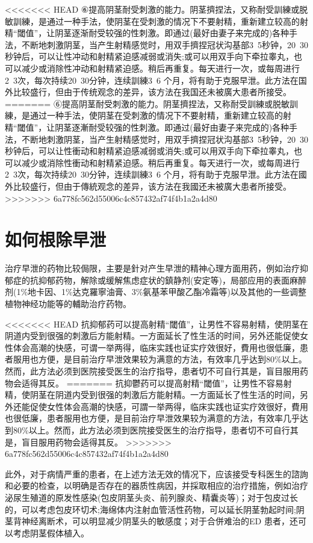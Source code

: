 \documentclass[12pt,UTF8]{ctexbook}
\begin{document}
<<<<<<< HEAD
⑥提高阴茎耐受刺激的能力。阴茎擠捏法，又称耐受訓練或脱敏訓練，是通过一种手法，使阴茎在受刺激的情况下不要射精，重新建立较高的射精“閾值”，让阴茎逐渐耐受较强的性刺激。即通过(最好由妻子来完成的)各种手法，不断地刺激阴茎，当产生射精感觉时，用双手擠捏冠状沟基部3~5秒钟，20~30秒钟后，可以让性冲动和射精紧迫感减弱或消失;或可以用双手向下牵拉睾丸，也可以减少或消除性冲动和射精紧迫感。稍后再重复。每天进行一次，或每周进行2~3次，每次持续20~30分钟，连续訓練3~6 个月，将有助于克服早泄。此方法在国外比较盛行，但由于传统观念的差异，该方法在我国还未被廣大患者所接受。
=======
⑥提高阴茎耐受刺激的能力。阴茎擠捏法，又称耐受訓練或脱敏訓練，是通过一种手法，使阴茎在受刺激的情况下不要射精，重新建立较高的射精“閾值”，让阴茎逐漸耐受较强的性刺激。即通过(最好由妻子来完成的)各种手法，不断地刺激阴茎，当产生射精感觉时，用双手擠捏冠状沟基部3~5秒钟，20~30秒钟后，可以让性衝动和射精紧迫感减弱或消失;或可以用双手向下牵拉睾丸，也可以减少或消除性衝动和射精紧迫感。稍后再重复。每天进行一次，或每周进行2~3次，每次持续20~30分钟，连续訓練3~6 个月，将有助于克服早泄。此方法在國外比较盛行，但由于傳統观念的差异，该方法在我國还未被廣大患者所接受。
>>>>>>> 6a778fc562d55006c4c857432af74f4b1a2a4d80

\section{如何根除早泄}

治疗早泄的药物比较侷限，主要是針对产生早泄的精神心理方面用药，例如治疗抑郁症的抗抑郁药物，解除或缓解焦虑症状的鎮静剂(安定等)，局部应用的表面麻醉剂(1\%地卡因、1\%达克羅寧油膏、3\%氨基苯甲酸乙酯冷霜等)以及其他的一些调整植物神经功能等的輔助治疗药物。

<<<<<<< HEAD
抗抑郁药可以提高射精“閾值”，让男性不容易射精，使阴茎在阴道内受到很强的刺激后方能射精。一方面延长了性生活的时间，另外还能促使女性体会高潮的快感，可谓一举两得，临床实践也证实疗效很好，費用也很低廉，患者服用也方便，是目前治疗早泄效果较为满意的方法，有效率几乎达到80\%以上。然而，此方法必须到医院接受医生的治疗指导，患者切不可自行其是，盲目服用药物会适得其反。
=======
抗抑鬱药可以提高射精“閾值”，让男性不容易射精，使阴茎在阴道内受到很强的刺激后方能射精。一方面延长了性生活的时间，另外还能促使女性体会高潮的快感，可謂一举两得，临床实践也证实疗效很好，費用也很低廉，患者服用也方便，是目前治疗早泄效果较为满意的方法，有效率几乎达到80\%以上。然而，此方法必须到医院接受医生的治疗指导，患者切不可自行其是，盲目服用药物会适得其反。
>>>>>>> 6a778fc562d55006c4c857432af74f4b1a2a4d80

此外，对于病情严重的患者，在上述方法无效的情况下，应该接受专科医生的諮詢和必要的检查，以明确是否存在的器质性病因，并採取相应的治疗措施，例如治疗泌尿生殖道的原发性感染(包皮阴茎头炎、前列腺炎、精囊炎等)；对于包皮过长的，可以考虑包皮环切术;海绵体内注射血管活性药物，可以延长阴茎勃起时间;阴茎背神经离断术，可以明显减少阴茎头的敏感度；对于合併难治的ED 患者，还可以考虑阴茎假体植入。
\end{document}
